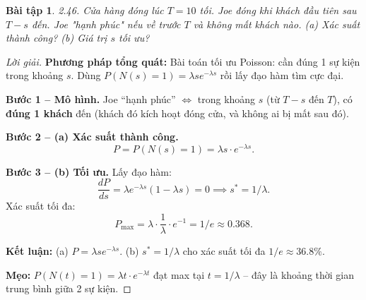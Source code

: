 \documentclass[8pt,a4paper]{article}
\newtheorem{exercise}{Bài tập}
\newenvironment{solution}{\begin{proof}[Lời giải]}{\end{proof}}
\begin{document}
\begin{exercise}
2.46. Cửa hàng đóng lúc $T=10$ tối. Joe đóng khi khách đầu tiên sau $T-s$ đến. Joe "hạnh phúc" nếu về trước $T$ và không mất khách nào.
(a) Xác suất thành công? (b) Giá trị $s$ tối ưu?
\end{exercise}
\begin{solution}
\textbf{Phương pháp tổng quát:} Bài toán tối ưu Poisson: cần đúng 1 sự kiện trong khoảng $s$. Dùng $P(N(s) = 1) = \lambda s e^{-\lambda s}$ rồi lấy đạo hàm tìm cực đại.

\textbf{Bước 1 -- Mô hình.} Joe ``hạnh phúc'' $\Leftrightarrow$ trong khoảng $s$ (từ $T-s$ đến $T$), có \textbf{đúng 1 khách} đến (khách đó kích hoạt đóng cửa, và không ai bị mất sau đó).

\textbf{Bước 2 -- (a) Xác suất thành công.}
\[
  P = P(N(s) = 1) = \lambda s \cdot e^{-\lambda s}.
\]

\textbf{Bước 3 -- (b) Tối ưu.} Lấy đạo hàm:
\[
  \frac{dP}{ds} = \lambda e^{-\lambda s}(1 - \lambda s) = 0 \implies s^* = \boxed{1/\lambda}.
\]
Xác suất tối đa:
\[
  P_{\max} = \lambda \cdot \frac{1}{\lambda} \cdot e^{-1} = \boxed{1/e \approx 0.368}.
\]

\textbf{Kết luận:} (a) $P = \lambda s e^{-\lambda s}$. (b) $s^* = 1/\lambda$ cho xác suất tối đa $1/e \approx 36.8\%$.

\textbf{Mẹo:} $P(N(t)=1) = \lambda t \cdot e^{-\lambda t}$ đạt max tại $t = 1/\lambda$ -- đây là khoảng thời gian trung bình giữa 2 sự kiện.
\end{solution}
\end{document}
